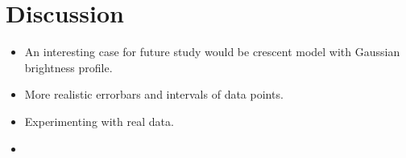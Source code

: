 \section{Discussion}


\begin{itemize}
\item An interesting case for future study would be crescent model with Gaussian brightness profile.
\item More realistic errorbars and intervals of data points.
\item Experimenting with real data.
\item 

\end{itemize}

